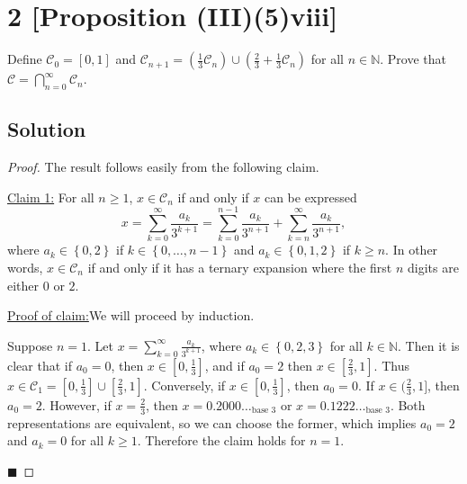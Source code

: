 \documentclass[12pt]{article}
\newenvironment{claimproof}[1]{\par\noindent\underline{Proof of claim:}\space#1}{\hfill $\blacksquare$\vspace{5mm}}
\begin{document}
\section*{2 [Proposition (III)(5)viii]}
Define $\mathcal{C}_{0} = [0,1]$ and $\mathcal{C}_{n+1} = \left( \frac{1}{3}\mathcal{C}_{n} \right) \cup \left( \frac{2}{3} +
\frac{1}{3}\mathcal{C}_{n} \right)$ for all $n \in \mathbb{N}$. Prove that $\mathcal{C} = \bigcap_{n=0}^{\infty} \mathcal{C}_{n}$.

\subsection*{Solution}

\begin{proof} The result follows easily from the following claim.

\underline{Claim 1:} For all $n \geq 1$, $x \in \mathcal{C}_{n}$ if and only if $x$ can be expressed 
\[ x = \sum_{k=0}^{\infty}\frac{a_{k}}{3^{k+1}} = \sum_{k=0}^{n-1}\frac{a_{k}}{3^{n+1}} + \sum_{k=n}^{\infty}\frac{a_{k}}{3^{n+1}}, \]
where $a_{k} \in \left\{ 0, 2 \right\}$ if $k \in \left\{ 0, \hdots, n-1 \right\}$ and $a_{k} \in \left\{ 0,1,2 \right\}$ if $k \geq n$. In other
words, $x \in \mathcal{C}_{n}$ if and only if it has a ternary expansion where the first $n$ digits are either $0$ or $2$.

\begin{claimproof}
We will proceed by induction.

Suppose $n = 1$. Let $x = \sum_{k=0}^{\infty}\frac{a_{k}}{3^{k+1}}$, where $a_{k} \in \left\{ 0,2,3 \right\}$ for all $k \in \mathbb{N}$. Then it is
clear that if $a_{0} = 0$, then $x \in \left[0,\frac{1}{3}\right]$, and if $a_{0} = 2$ then $x \in \left[ \frac{2}{3}, 1 \right]$. Thus $x \in
\mathcal{C}_{1} = \left[ 0, \frac{1}{3} \right] \cup \left[ \frac{2}{3}, 1 \right]$. Conversely, if $x \in \left[ 0, \frac{1}{3} \right]$, then $a_{0}
= 0$. If $x \in \big( \frac{2}{3},1 \big]$, then $a_{0} = 2$. However, if $x = \frac{2}{3}$, then $x = 0.2000\hdots_{\text{base 3}}$ or $x =
0.1222\hdots_{\text{base 3}}$. Both representations are equivalent, so we can choose the former, which implies $a_{0} = 2$ and $a_{k} = 0$ for all $k \geq
1$. Therefore the claim holds for $n = 1$.


\end{claimproof}
\end{proof}
\end{document}
